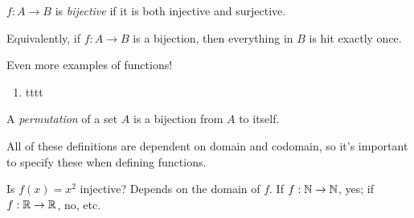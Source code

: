 \documentclass{../template/note}
\begin{document}
    \begin{definition}
        \(f: A \to B\) is \emph{bijective} if it is both injective and surjective.
    \end{definition}
    \noindent Equivalently, if \(f: A \to B\) is a bijection, then everything in \(B\) is hit exactly once.
    
    \begin{example}
        Even more examples of functions!

        \begin{enumerate}[label=\protect\circled{\arabic*}]
            \item tttt
        \end{enumerate}
        
        
    \end{example}

    \begin{definition}
        A \emph{permutation} of a set \(A\) is a bijection from \(A\) to itself.
    \end{definition}
    
    All of these definitions are dependent on domain and codomain, so it's important to specify these when defining functions.

    \begin{example}
        Is \(f(x) = x^2\) injective? Depends on the domain of \(f\). If \(f: \mathbb N \to \mathbb N\), yes; if \(f: \mathbb R \to \mathbb R\), no, etc.
    \end{example}
    
\end{document}
